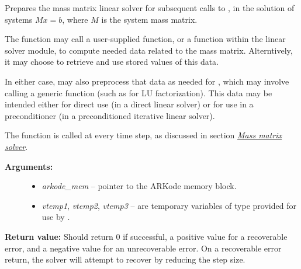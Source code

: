 \documentclass[letterpaper,10pt,english]{sphinxmanual}
\begin{document}
\begin{fulllineitems}
\label{linear_solvers/custom:msetup}
Prepares the mass matrix linear solver for subsequent calls to
{\hyperref[linear_solvers/custom:msolve]{}}, in the solution of systems $M x = b$,
where $M$ is the system mass matrix.

The {\hyperref[linear_solvers/custom:msetup]{}} function may call a user-supplied function,
or a function within the linear solver module, to compute needed
data related to the mass matrix.  Alterntively, it may choose to
retrieve and use stored values of this data.

In either case, {\hyperref[linear_solvers/custom:msetup]{}} may also preprocess that data as
needed for {\hyperref[linear_solvers/custom:msolve]{}}, which may involve calling a generic
function (such as for LU factorization).  This data may be intended
either for direct use (in a direct linear solver) or for use in a
preconditioner (in a preconditioned iterative linear solver).

The {\hyperref[linear_solvers/custom:msetup]{}} function is called at every time step, as
discussed in section {\hyperref[Mathematics:mathematics-masssolve]{\emph{Mass matrix solver}}}.
\begin{description}
\item[{\textbf{Arguments:}}] \leavevmode\begin{itemize}
\item {} 
\emph{arkode\_mem} -- pointer to the ARKode memory block.

\item {} 
\emph{vtemp1}, \emph{vtemp2}, \emph{vtemp3} -- are temporary variables of
type  provided for use by {\hyperref[linear_solvers/custom:msetup]{}}.

\end{itemize}

\end{description}

\textbf{Return value:}
Should return 0 if successful, a positive value
for a recoverable error, and a negative value for an unrecoverable
error.  On a recoverable error return, the solver will attempt to
recover by reducing the step size.

\end{fulllineitems}
\end{document}
